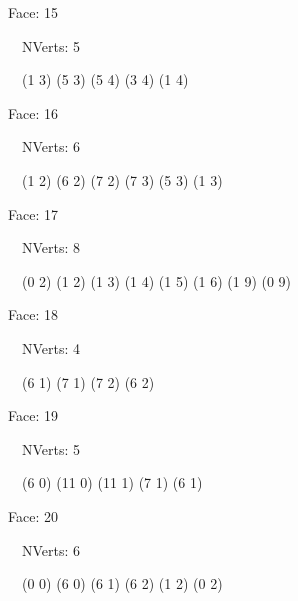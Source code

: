 \documentclass{article}
\begin{document}
{\footnotesize 

Face: 15

\   \    NVerts: 5

 \   \   (1 3) (5 3) (5 4) (3 4) (1 4)}

{\footnotesize 

Face: 16

\   \    NVerts: 6

 \   \   (1 2) (6 2) (7 2) (7 3) (5 3) (1 3)}

{\footnotesize 

Face: 17

\   \    NVerts: 8

 \   \   (0 2) (1 2) (1 3) (1 4) (1 5) (1 6) (1 9) (0 9)}

{\footnotesize 

Face: 18

\   \    NVerts: 4

 \   \   (6 1) (7 1) (7 2) (6 2)}

{\footnotesize 

Face: 19

\   \    NVerts: 5

 \   \   (6 0) (11 0) (11 1) (7 1) (6 1)}

{\footnotesize 

Face: 20

\   \    NVerts: 6

 \   \   (0 0) (6 0) (6 1) (6 2) (1 2) (0 2)}


 \newpage
\end{document}

